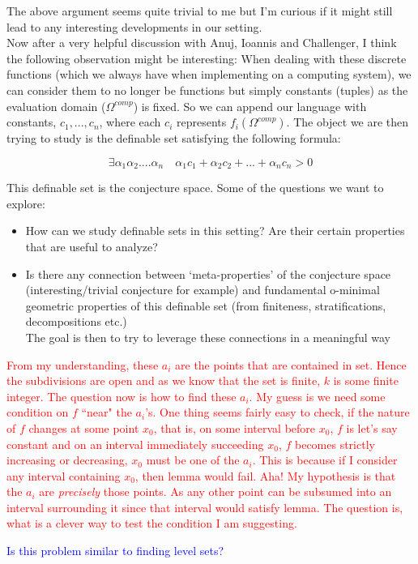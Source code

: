 The above argument seems quite trivial to me but I'm curious if it might still lead to any interesting developments in our setting.\\
Now after a very helpful discussion with Anuj, Ioannis and Challenger, I think the following observation might be interesting:
When dealing with these discrete functions (which we always have when implementing on a computing system), we can consider them to no longer be functions but simply constants (tuples) as the evaluation domain ($\Omega^{comp}$) is fixed. So we can append our language with constants, $c_1,...,c_n$, where each $c_i$ represents $f_i(\Omega^{comp})$. The object we are then trying to study is the definable set satisfying the following formula:

\begin{equation*}
    \exists\alpha_1\alpha_2....\alpha_n\quad\alpha_1c_1+\alpha_2c_2+...+\alpha_nc_n > 0
\end{equation*}

This definable set is the conjecture space. Some of the questions we want to explore: 
\begin{itemize}
    \item How can we study definable sets in this setting? Are their certain properties that are useful to analyze?
    \item Is there any connection between `meta-properties' of the conjecture space (interesting/trivial conjecture for example) and fundamental o-minimal geometric properties of this definable set (from finiteness, stratifications, decompositions etc.) \\ The goal is then to try to leverage these connections in a meaningful way
\end{itemize}



\textcolor{red}{From my understanding, these $a_i$ are the points that are contained in set. Hence the subdivisions are open and as we know that the set is finite, $k$ is some finite integer. The question now is how to find these $a_i$. My guess is we need some condition on $f$ ``near" the $a_i$'s. One thing seems fairly easy to check, if the nature of $f$ changes at some point $x_0$, that is, on some interval before $x_0$, $f$ is let's say constant and on an interval immediately succeeding $x_0$, $f$ becomes strictly increasing or decreasing, $x_0$ must be one of the $a_i$. This is because if I consider any interval containing $x_0$, then lemma would fail. Aha! My hypothesis is that the $a_i$ are \textit{precisely} those points. As any other point can be subsumed into an interval surrounding it since that interval would satisfy lemma. The question is, what is a clever way to test the condition I am suggesting.}
\par
\textcolor{blue}{Is this problem similar to finding level sets?}

